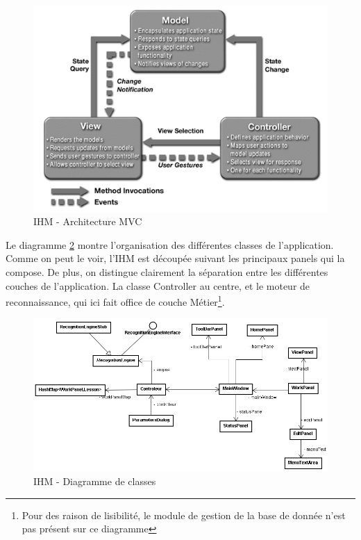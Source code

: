 \begin{figure}[h]
 \centering
 \includegraphics[scale=0.8]{./images/mvc.png}
 \caption{IHM - Architecture MVC }
 \label{fig:mvc}
\end{figure}


Le diagramme \ref{fig:ihmUMLl} montre l'organisation des différentes classes de l'application. Comme on peut le voir, l'IHM est découpée suivant les principaux panels qui la compose. De plus, on distingue clairement la séparation entre les différentes couches de l'application. La classe Controller au centre, et le moteur de reconnaissance, qui ici fait office de couche Métier\footnote{Pour des raison de lisibilité, le module de gestion de la base de donnée n'est pas présent sur ce diagramme}.



\begin{figure}[h]
 \centering
 \includegraphics[scale=0.5]{./images/ihmUML.png}
 \caption{IHM - Diagramme de classes}
 \label{fig:ihmUMLl}
\end{figure}


